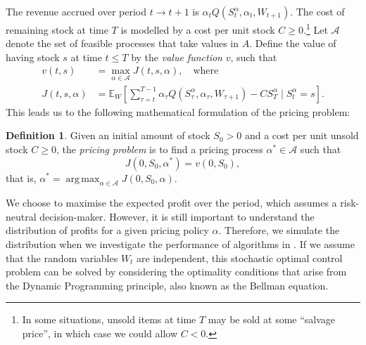 \documentclass{rsproca_new}
\DeclareMathOperator*{\argmax}{arg\,max}
\theoremstyle{definition}
\newtheorem{mydef}{Definition}[section]
\begin{document}
The revenue accrued over period $t\to t+1$ is $\alpha_tQ(S_t^\alpha,\alpha_t,W_{t+1})$.
The cost of remaining stock at time $T$ is modelled by a cost per unit
stock $C\geq 0$.\footnote{In some situations, unsold items at time $T$
  may be sold at some ``salvage price'', in which case we could allow
  $C<0$.}
Let $\mathcal A$ denote the set of feasible processes that take values
in $A$.
Define the value of having stock $s$ at time $t\leq T$
by the \emph{value function} $v$, such that
\begin{align}\label{eq:value_function_def}
  v(t,s)&=\max_{\alpha\in\mathcal A} J(t,s,\alpha),\quad\text{where}\\
  J(t,s,\alpha)&=
                 \mathbb E_{W}\left[ \sum_{\tau=t}^{T-1}
                 \alpha_\tau Q(S_\tau^\alpha,\alpha_\tau,W_{\tau+1})
                 - CS_T^\alpha \mid S_t^\alpha = s
                 \right].
                 \label{eq:value_function_def2}
\end{align}
This leads us to the following mathematical formulation of the pricing
problem:
\begin{mydef}
  Given an initial amount of stock $S_0>0$ and a cost per unit unsold stock $C\geq
  0$, the \emph{pricing problem} is to find a pricing process $\alpha^*\in\mathcal A$ such that
  \begin{equation}
    J(0,S_0,\alpha^*) = v(0,S_0),
  \end{equation}
  that is, $\alpha^* = \argmax_{\alpha\in\mathcal A}J(0,S_0,\alpha)$.
\end{mydef}
We choose to maximise the expected profit over the period, which
assumes a risk-neutral decision-maker. However, it is still important
to understand the distribution of profits for a given pricing policy
$\alpha$. Therefore, we simulate the distribution when
we investigate the performance of algorithms in
. %
If we assume that the random variables $W_t$ are independent, this
stochastic optimal control problem can be solved by
considering the optimality conditions that arise from the Dynamic
Programming principle, also known as the Bellman equation.
\end{document}
